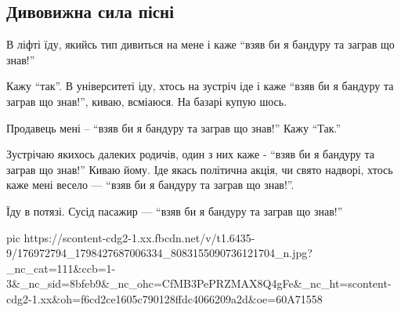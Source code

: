  
 
 
 
 

\subsection{Дивовижна сила пісні}

В  ліфті  їду, якийсь тип дивиться на мене і каже \enquote{взяв би я бандуру та заграв що знав!} 

Кажу \enquote{так}. В університеті іду, хтось на зустріч іде  і каже   
\enquote{взяв би я бандуру та заграв що знав!},   киваю, всміаюся. На базарі купую  шось.

Продавець  мені -- \enquote{взяв би я бандуру та заграв що знав!} Кажу \enquote{Так.}

Зустрічаю  якихось  далеких  родичів,  один з  них  каже - \enquote{взяв би я бандуру та заграв що знав!} 
Киваю йому. Іде якась  політична акція, чи свято надворі,
хтось  каже мені весело --- \enquote{взяв би я бандуру та заграв що знав!}.

Їду в потязі. Сусід  пасажир  --- \enquote{взяв би я бандуру та заграв що знав!}

\ifcmt
  pic https://scontent-cdg2-1.xx.fbcdn.net/v/t1.6435-9/176972794_1798427687006334_8083155090736121704_n.jpg?_nc_cat=111&ccb=1-3&_nc_sid=8bfeb9&_nc_ohc=CfMB3PePRZMAX8Q4gFe&_nc_ht=scontent-cdg2-1.xx&oh=f6cd2ce1605c790128ffdc4066209a2d&oe=60A71558
\fi

